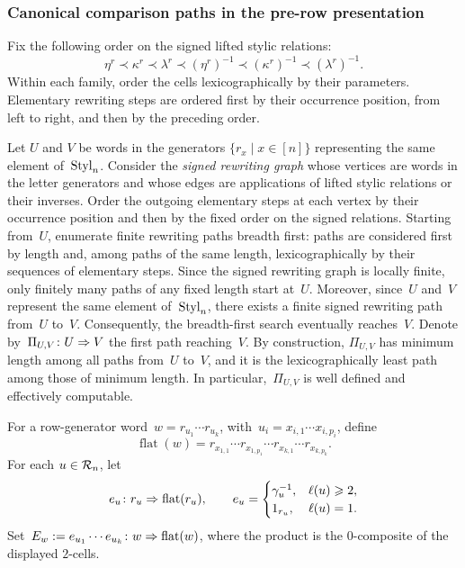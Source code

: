 \documentclass[a4paper, twoside, 11pt, english]{article}
\begin{document}
\subsubsection{Canonical comparison paths in the pre-row presentation}
\label{SSS:CanonicalPreRowPaths}

Fix the following order on the signed lifted stylic relations:
\[
\eta^r
\prec
\kappa^r
\prec
\lambda^r
\prec
(\eta^r)^{-1}
\prec
(\kappa^r)^{-1}
\prec
(\lambda^r)^{-1}.
\]
Within each family, order the cells lexicographically by their parameters.
Elementary rewriting steps are ordered first by their occurrence position,
from left to right, and then by the preceding order.

Let $U$ and $V$ be words in the generators
$\{r_x\mid x\in[n]\}$ representing the same element of~$\mathrm{Styl}_n$.
Consider the \emph{signed rewriting graph} whose vertices are words in the
letter generators and whose edges are applications of lifted stylic
relations or their inverses. Order the outgoing elementary steps at each
vertex by their occurrence position and then by the fixed order on the
signed relations.
Starting from~$U$, enumerate finite rewriting paths breadth first:
paths are considered first by length and, among paths of the same
length, lexicographically by their sequences of elementary steps.
Since the signed rewriting graph is locally finite, only finitely many
paths of any fixed length start at~$U$. Moreover, since~$U$ and~$V$
represent the same element of~$\mathrm{Styl}_n$, there exists a finite signed
rewriting path from~$U$ to~$V$. Consequently, the breadth-first search
eventually reaches~$V$.
Denote by~$\Pi_{U,V}\colon U\Rightarrow V$ the first path reaching~$V$. By construction, $\Pi_{U,V}$ has minimum
length among all paths from~$U$ to~$V$, and it is the
lexicographically least path among those of minimum length. In
particular,~$\Pi_{U,V}$ is well defined and effectively computable.

For a row-generator word~$w=r_{u_1}\cdots r_{u_k}$, with~$u_i=x_{i,1}\cdots x_{i,p_i}$, define
\[
\operatorname{flat}(w)
=
r_{x_{1,1}}\cdots r_{x_{1,p_1}}
\cdots
r_{x_{k,1}}\cdots r_{x_{k,p_k}}.
\]
For each $u\in\mathcal{R}_n$, let
\[
e_u\colon r_u\Rightarrow\operatorname{flat}(r_u),
\qquad
e_u=
\begin{cases}
\gamma_u^{-1}, & \ell(u)\geqslant 2,\\
1_{r_u},       & \ell(u)=1.
\end{cases}
\]
Set~$E_w:=e_{u_1}\cdots e_{u_k}
\colon
w\Rightarrow\operatorname{flat}(w)$,
where the product is the $0$-composite of the displayed $2$-cells.
\end{document}
